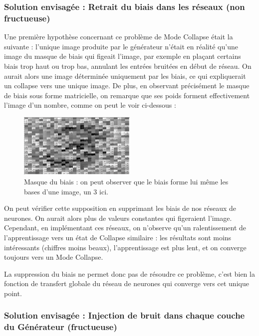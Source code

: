 \subsubsection{Solution envisagée : Retrait du biais dans les réseaux (non fructueuse)}

Une première hypothèse concernant ce problème de Mode Collapse était la suivante : l'unique image produite par le générateur n'était en réalité qu'une image du masque de biais qui figeait l'image, par exemple en plaçant certains biais trop haut ou trop bas, annulant les entrées bruitées en début de réseau. On aurait alors une image déterminée uniquement par les biais, ce qui expliquerait un collapse vers une unique image.
De plus, en observant précisément le masque de biais sous forme matricielle, on remarque que ses poids forment effectivement l'image d'un nombre, comme on peut le voir ci-dessous :

\begin{figure}[h]
\begin{center}
\includegraphics[width=0.5\textwidth]{images/masqueBiais.png}\caption{Masque du biais : on peut observer que le biais forme lui même les bases d'une image, un 3 ici.}
\end{center}
\end{figure}

On peut vérifier cette supposition en supprimant les biais de nos réseaux de neurones. On aurait alors plus de valeurs constantes qui figeraient l'image. Cependant, en implémentant ces réseaux, on n'observe qu'un ralentissement de l'apprentissage vers un état de Collapse similaire : les résultats sont moins intéressants (chiffres moins beaux), l'apprentissage est plus lent, et on converge toujours vers un Mode Collapse.

La suppression du biais ne permet donc pas de résoudre ce problème, c'est bien la fonction de transfert globale du réseau de neurones qui converge vers cet unique point.  


\subsubsection{Solution envisagée : Injection de bruit dans chaque couche du Générateur (fructueuse)}

